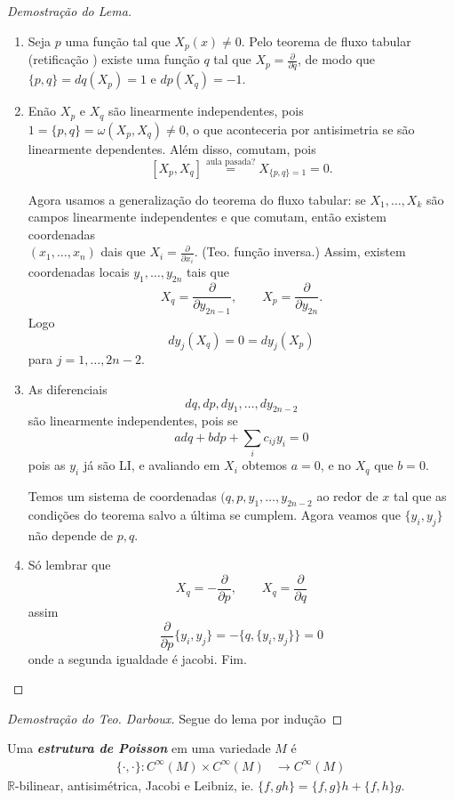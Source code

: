 \begin{proof}[Demostra\c c\~ao do Lema]
	\begin{enumerate}[label=\textbf{Paso \arabic*}]
		\item Seja $p$ uma fun\c c\~ao tal que $X_p(x)\neq 0$. Pelo teorema de fluxo tabular (retifica\c c\~ao ) existe uma fun\c c\~ao $q$ tal que $X_p=\frac{\partial}{\partial q}$, de modo que $\{p,q\}=dq(X_p)=1$ e $dp(X_q)=-1$.

		\item En\~ao $X_p$ e $X_q$ s\~ao linearmente independentes, pois $1=\{p,q\} =\omega(X_p,X_q)\neq 0$, o que aconteceria por antisimetria se s\~ao linearmente dependentes. Al\'em disso, comutam, pois
			\[ [X_p,X_q]\overset{\text{aula pasada?} }{=}X_{\{p,q\} =1}=0.\]

			Agora usamos a generaliza\c c\~ao do teorema do fluxo tabular: se $X_1,\ldots,X_k$ s\~ao campos  linearmente independentes e que comutam, ent\~ao existem coordenadas\\ $(x_1,\ldots,x_n)$ dais que $X_i=\frac{\partial}{\partial x_i}$. (Teo. fun\c c\~ao inversa.) Assim, existem coordenadas locais $y_1,\ldots,y_{2n}$ tais que
			\[X_q=\frac{\partial}{\partial y_{2n-1}},\qquad  X_p=\frac{\partial}{\partial y_{2n}}.\]
			Logo
			\[dy_j(X_q)=0=dy_j(X_p)\]
			para $j=1,\ldots,2n-2$.

		\item As diferenciais
		\[dq,dp,dy_1,\ldots,dy_{2n-2}\]
		s\~ao linearmente independentes, pois se
		\[adq+bdp+\sum_{i}c_{ij}y_i=0\]
		pois as $y_i$ j\'a s\~ao LI, e avaliando em $X_i$ obtemos $a=0$, e no $X_q$ que $b=0$.

		Temos um sistema de coordenadas  $(q,p,y_1,\ldots,y_{2n-2}$ ao redor de $x$ tal que as condi\c c\~oes  do teorema salvo a \'ultima se cumplem. Agora veamos que $\{y_i,y_j\}$ n\~ao depende de $p,q$.

		 \item S\'o lembrar que
			 \[X_q=-\frac{\partial}{\partial p},\qquad X_q=\frac{\partial}{\partial q}\]
			 assim
			 \[ \frac{\partial}{\partial p}\{y_i,y_j\} =-\{q,\{y_i,y_j\}\} =0\]
			 onde a segunda igualdade \'e jacobi. Fim.
	\end{enumerate}
\end{proof}

\begin{proof}[Demostra\c c\~ao do Teo. Darboux]
Segue do lema por indu\c c\~ao
\end{proof}

\begin{defn}
Uma \textit{\textbf{estrutura de Poisson}} em uma variedade $M$ \'e
\begin{align*}
	\{\cdot ,\cdot \}: C^\infty(M)\times C^\infty(M) &\longrightarrow C^\infty(M)
\end{align*}
$\mathbb{R}$-bilinear, antisim\'etrica, Jacobi e Leibniz, ie. $\{f,gh\} =\{f,g\} h+\{f,h\} g$.
\end{defn}

